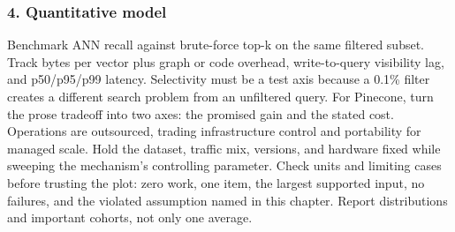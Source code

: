 \subsubsection*{4. Quantitative model}
Benchmark ANN recall against brute-force top-k on the same filtered subset. Track bytes per vector plus graph or code overhead, write-to-query visibility lag, and p50/p95/p99 latency. Selectivity must be a test axis because a 0.1\% filter creates a different search problem from an unfiltered query.
For Pinecone, turn the prose tradeoff into two axes: the promised gain and the stated cost. Operations are outsourced, trading infrastructure control and portability for managed scale. Hold the dataset, traffic mix, versions, and hardware fixed while sweeping the mechanism's controlling parameter.
Check units and limiting cases before trusting the plot: zero work, one item, the largest supported input, no failures, and the violated assumption named in this chapter. Report distributions and important cohorts, not only one average.
